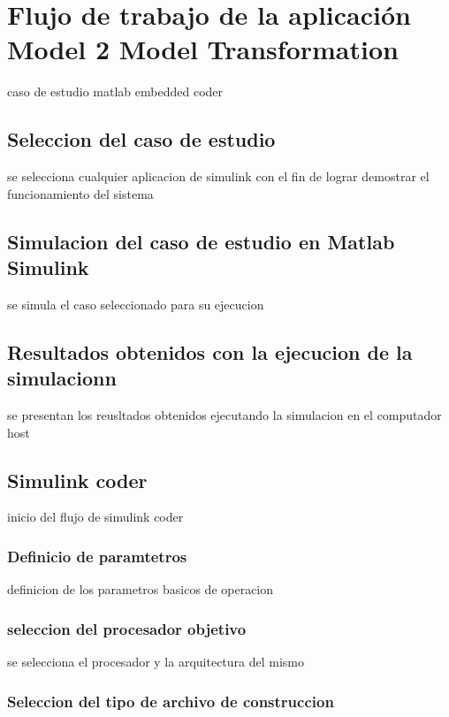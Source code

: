 \section{Flujo de trabajo de la aplicación Model 2 Model Transformation}
caso de estudio matlab embedded coder


\subsection{Seleccion del caso de estudio}

se selecciona cualquier aplicacion de simulink con el fin de lograr demostrar el funcionamiento del sistema

\subsection{Simulacion del caso de estudio en Matlab Simulink}

se simula el caso seleccionado para su ejecucion 

\subsection{Resultados obtenidos con la ejecucion de la simulacionn}

se presentan los reusltados obtenidos ejecutando la simulacion en el computador host

\subsection{Simulink coder}

inicio del flujo de simulink coder 

\subsubsection{Definicio de paramtetros}

definicion de los parametros basicos de operacion

\subsubsection{seleccion del procesador objetivo}

se selecciona el procesador y la arquitectura del mismo

\subsubsection{Seleccion del tipo de archivo de construccion}

